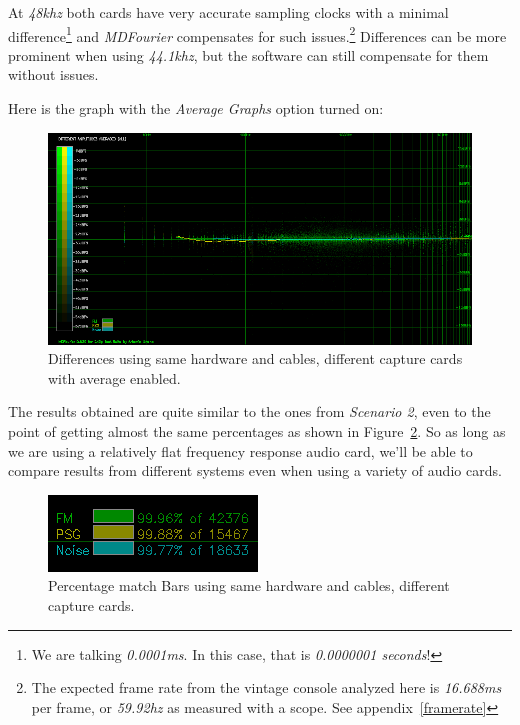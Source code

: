 \documentclass[10pt,a4paper]{report}
\newcommand{\ac}[1]{\textit{\mbox{\acrshort{#1}}}}
\newcommand{\hz}[1]{\textit{\mbox{#1\acrshort{hz}}}}
\newcommand{\khz}[1]{\textit{\mbox{#1\acrshort{khz}}}}
\begin{document}
At \khz{48} both cards have very accurate sampling clocks with a minimal difference\footnote{We are talking \textit{0.0001}\ac{ms}. In this case, that is \textit{0.0000001 seconds}!} and \textit{MDFourier} compensates for such issues.\footnote{The expected frame rate from the vintage console analyzed here is \textit{16.688}\ac{ms} per frame, or \hz{59.92} as measured with a scope. See appendix~\ref{framerate}} Differences can be more prominent when using \khz{44.1}, but the software can still compensate for them without issues.

Here is the graph with the \textit{Average Graphs} option turned on:

\begin{figure}[H]
	\centering
	\includegraphics[width=1.0\linewidth]{images/interpretation/Plot5-2-avg.png}
	\caption[Different sound cards AVG]{Differences using same hardware and cables, different capture cards with average enabled.}
	\label{fig:plot5-2-avg}
\end{figure}

The results obtained are quite similar to the ones from \textit{Scenario 2}, even to the point of getting almost the same percentages as shown in Figure~\ref{fig:plot5-3-bars}. So as long as we are using a relatively flat frequency response audio card, we'll be able to compare results from different systems even when using a variety of audio cards.

\begin{figure}[H]
	\centering
	\includegraphics[width=0.4\linewidth]{images/interpretation/Plot5-3-bars.png}
	\caption[Different sound cards Bars]{Percentage match Bars using same hardware and cables, different capture cards.}
	\label{fig:plot5-3-bars}
\end{figure}
\end{document}
